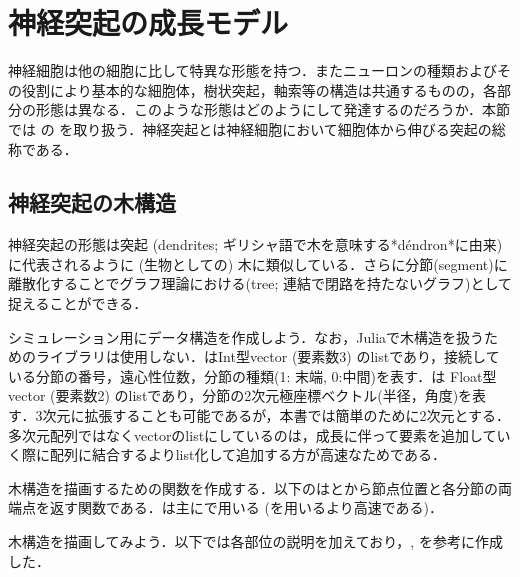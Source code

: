 \section{神経突起の成長モデル}
神経細胞は他の細胞に比して特異な形態を持つ．またニューロンの種類およびその役割により基本的な細胞体，樹状突起，軸索等の構造は共通するものの，各部分の形態は異なる．このような形態はどのようにして発達するのだろうか．本節では\textbf{} の\textbf{} を取り扱う．神経突起とは神経細胞において細胞体から伸びる突起の総称である．
\subsection{神経突起の木構造}
神経突起の形態は\textbf{}突起 (dendrites; ギリシャ語で木を意味する*déndron*に由来) に代表されるように (生物としての) 木に類似している．さらに分節(segment)に離散化することでグラフ理論における\textbf{}(tree; 連結で閉路を持たないグラフ)として捉えることができる．

シミュレーション用にデータ構造を作成しよう．なお，Juliaで木構造を扱うためのライブラリは使用しない．はInt型vector (要素数3) のlistであり，接続している分節の番号，遠心性位数，分節の種類(1: 末端, 0:中間)を表す．は Float型vector (要素数2) のlistであり，分節の2次元極座標ベクトル(半径，角度)を表す．3次元に拡張することも可能であるが，本書では簡単のために2次元とする．多次元配列ではなくvectorのlistにしているのは，成長に伴って要素を追加していく際に配列に結合するよりlist化して追加する方が高速なためである．


木構造を描画するための関数を作成する．以下のはとから節点位置と各分節の両端点を返す関数である．は主にで用いる (を用いるより高速である)．


木構造を描画してみよう．以下では各部位の説明を加えており，\cite{Koene2009-hv}, \cite{Cuntz2010-in}を参考に作成した．



